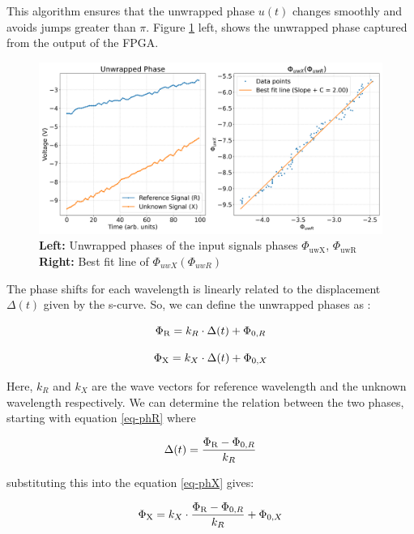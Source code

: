 \documentclass[12pt, twoside]{report}
\begin{document}
\begin{enumerate}
This algorithm ensures that the unwrapped phase $u(t)$ changes smoothly and avoids jumps greater than $\pi$. Figure \ref{fig:unwrp-ph} left, shows the unwrapped phase captured from the output of the FPGA.

\begin{figure}[H]
    \centering
    \includegraphics[width=\textwidth]{figs/unwrp-ph.png}
    \caption{\textbf{Left:} Unwrapped phases of the input signals phases $\Phi_{\text{uwX}}$, $\Phi_{\text{uwR}}$ \linebreak \textbf{Right:} Best fit line of $\Phi_{uwX}(\Phi_{uwR})$ }
    \label{fig:unwrp-ph}
\end{figure}

The phase shifts for each wavelength is linearly related to the displacement $\Delta(t)$ given by the s-curve. So, we can define the unwrapped phases as :

\begin{equation}
\Phi_{\text R} = k_R \cdot \Delta(t) + \Phi_{\text 0,R}
\label{eq-phR}
\end{equation}

\begin{equation}
\Phi_{\text X} = k_X \cdot \Delta(t) + \Phi_{\text 0,X}
\label{eq-phX}
\end{equation}

Here, $k_R$ and $k_X$ are the wave vectors for reference wavelength and the unknown wavelength respectively. We can determine the relation between the two phases, starting with equation \ref{eq-phR} where

\begin{equation}
\Delta(t) = \frac{\Phi_{\text R} - \Phi_{\text 0,R}}{k_R}
\end{equation}

substituting this into the equation \ref{eq-phX} gives:

\begin{equation}
\Phi_{\text X} = k_X \cdot \frac{\Phi_{\text R} - \Phi_{\text 0,R}}{k_R} + \Phi_{\text 0,X}
\end{equation}


\end{enumerate}
\end{document}
